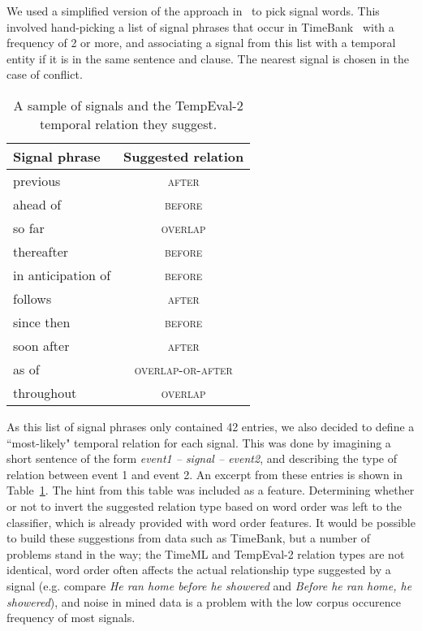 \documentclass[11pt]{article}
\begin{document}
We used a simplified version of the approach in~ to pick signal words. This involved hand-picking a list of signal phrases that occur in TimeBank~\cite{pustejovsky2003timebank} with a frequency of 2 or more, and associating a signal from this list with a temporal entity if it is in the same sentence and clause. The nearest signal is chosen in the case of conflict.

\small
\begin{table}
\begin{center}
\caption{A sample of signals and the TempEval-2 temporal relation they suggest.}
\label{tab:signalHints}
\begin{tabular}{| l | c |}
\hline
 \textbf{Signal phrase} & \textbf{Suggested relation} \\
\hline
previous & \textsc{after} \\
ahead of & \textsc{before} \\
so far & \textsc{overlap} \\
thereafter & \textsc{before} \\
in anticipation of & \textsc{before} \\
follows & \textsc{after} \\
since then & \textsc{before} \\
soon after & \textsc{after} \\
as of & \textsc{overlap-or-after} \\
throughout & \textsc{overlap} \\
\hline
\end{tabular}
\end{center}
\end{table}
\normalsize

As this list of signal phrases only contained 42 entries, we also decided to define a ``most-likely" temporal relation for each signal. This was done by imagining a short sentence of the form \emph{event1 -- signal -- event2}, and describing the type of relation between event 1 and event 2. An excerpt from these entries is shown in Table~\ref{tab:signalHints}. The hint from this table was included as a feature. Determining whether or not to invert the suggested relation type based on word order was left to the classifier, which is already provided with word order features. It would be possible to build these suggestions from data such as TimeBank, but a number of problems stand in the way; the TimeML and TempEval-2 relation types are not identical, word order often affects the actual relationship type suggested by a signal (e.g. compare \emph{He ran home before he showered} and \emph{Before he ran home, he showered}), and noise in mined data is a problem with the low corpus occurence frequency of most signals.
\end{document}
